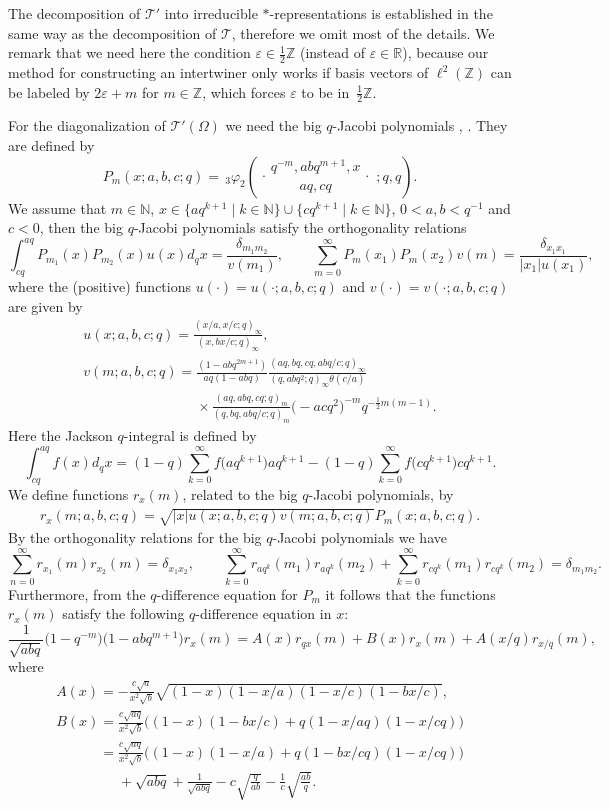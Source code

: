 \documentclass[pdftex]{sigma}
\numberwithin{equation}{section}
\numberwithin{theorem}{section}
\numberwithin{proposition}{section}
\numberwithin{lemma}{section}
\numberwithin{corollary}{section}
\numberwithin{definition}{section}
\numberwithin{example}{section}
\numberwithin{remark}{section}
\numberwithin{note}{section}
\newcommand{\R}{\mathbb R}
\newcommand{\N}{\mathbb N}
\newcommand{\Z}{\mathbb Z}
\newcommand{\eps}{\varepsilon}
\newcommand{\rphis}[5]{\,_{#1}\varphi_{#2} \left( \genfrac{.}{.}{0pt}{}{#3}{#4}
\ ;#5 \right)}
\begin{document}
The decomposition of $\mathcal T'$ into irreducible $*$-representations is established in the same way as the decomposition of $\mathcal T$, therefore we omit most of the details. We remark that we need here the condition $\eps \in \frac12\Z$ (instead of $\eps \in \R$), because our method for constructing an intertwiner only works if basis vectors of $\ell^2(\Z)$ can be labeled by $2\eps+m$ for $m \in \Z$, which forces $\eps$ to be in~$\frac12\Z$.

For the diagonalization of $\mathcal T'(\Omega)$ we need the big $q$-Jacobi polynomials \cite{AA}, \cite[\S~14.5]{KLS}. They are def\/ined by
\[
P_m(x;a,b,c;q) = \rphis{3}{2}{q^{-m},abq^{m+1},x}{aq,cq}{q,q}.
\]
We assume that $m \in \N$, $x \in \{aq^{k+1} \mid k \in \N\} \cup \{ cq^{k+1} \mid k \in \N\}$, $0<a,b<q^{-1}$ and $c<0$, then the big $q$-Jacobi polynomials satisfy the orthogonality relations
\[
\int_{cq}^{aq} P_{m_1}(x)P_{m_2}(x) u(x) d_q x = \frac{\delta_{m_1m_2}}{v(m_1)}, \qquad \sum_{m=0}^\infty P_m(x_1)P_m(x_2) v(m) = \frac{\delta_{x_1x_1}}{|x_1|u(x_1)},
\]
where the (positive) functions $u(\cdot) = u(\cdot;a,b,c;q)$ and  $v(\cdot)=v(\cdot;a,b,c;q)$ are given by
\begin{gather*}
u(x;a,b,c;q) = \frac{ (x/a,x/c;q)_\infty }{(x,bx/c;q)_\infty},\nonumber \\
v(m;a,b,c;q) = \frac{ (1-abq^{2m+1})}{aq(1-abq)} \frac{ (aq,bq,cq,abq/c;q)_\infty }{ (q,abq^2;q)_\infty \theta(c/a) }\nonumber\\
 \phantom{v(m;a,b,c;q) =}{}
 \times \frac{ (aq,abq,cq;q)_m }{ (q,bq,abq/c;q)_m } \big({-}acq^2\big)^{-m} q^{-\frac12 m(m-1)}.%
\end{gather*}
Here the Jackson $q$-integral is def\/ined by
\[
\int_{cq}^{aq} f(x)d_q x= (1-q)\sum_{k=0}^\infty f\big(aq^{k+1}\big)aq^{k+1} - (1-q)\sum_{k=0}^\infty f\big(cq^{k+1}\big)cq^{k+1}.
\]
We def\/ine functions $r_x(m)$, related to the big $q$-Jacobi polynomials, by
\begin{gather*} %
r_x(m;a,b,c;q) = \sqrt{|x| u(x;a,b,c;q) v(m;a,b,c;q)} P_m(x;a,b,c;q).
\end{gather*}
By the orthogonality relations for the big $q$-Jacobi polynomials we have
\[
\sum_{n=0}^\infty r_{x_1}(m) r_{x_2}(m)  = \delta_{x_1x_2}, \qquad
\sum_{k=0}^\infty  r_{aq^k}(m_1) r_{aq^k}(m_2) + \sum_{k=0}^\infty  r_{cq^k}(m_1) r_{cq^k}(m_2) = \delta_{m_1m_2}.
\]
Furthermore, from the $q$-dif\/ference equation for $P_m$ it follows that the functions $r_x(m)$ satisfy the following $q$-dif\/ference equation in $x$:
\[
\frac1{\sqrt{abq}}\big(1-q^{-m}\big)\big(1-abq^{m+1}\big) r_x(m) = A(x) r_{qx}(m) + B(x) r_x(m) + A(x/q) r_{x/q}(m),
\]
where
\begin{gather*}
A(x)  = -\frac{c\sqrt a}{ x^2\sqrt{b}} \sqrt{ (1-x)(1-x/a)(1-x/c)(1-bx/c) },\\
B(x)  = \frac{c\sqrt{aq}}{x^2\sqrt{b}}\big( (1-x)(1-bx/c)+q(1-x/aq)(1-x/cq) \big) \\
\phantom{B(x)}{}  = \frac{c\sqrt{aq}}{x^2\sqrt{b}}\big( (1-x)(1-x/a)+q(1-bx/cq)(1-x/cq) \big) \\
\phantom{B(x)=}{}
+ \sqrt{abq} + \frac{1}{\sqrt{abq}}-c\sqrt{\frac{q}{ab}}- \frac1c\sqrt{\frac{ab}{q}}.
\end{gather*}
\end{document}
